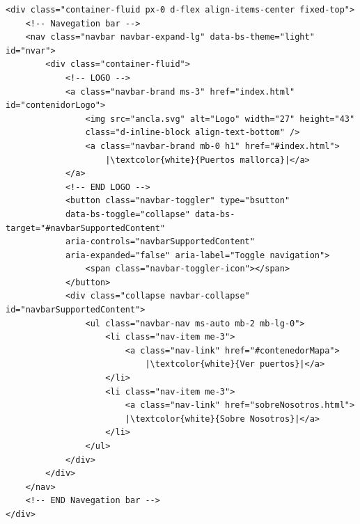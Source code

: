 \documentclass{article}
\begin{document}
\begin{verbatim}
<div class="container-fluid px-0 d-flex align-items-center fixed-top">
    <!-- Navegation bar -->
    <nav class="navbar navbar-expand-lg" data-bs-theme="light" id="nvar">
        <div class="container-fluid">
            <!-- LOGO -->
            <a class="navbar-brand ms-3" href="index.html" id="contenidorLogo">
                <img src="ancla.svg" alt="Logo" width="27" height="43" 
                class="d-inline-block align-text-bottom" />
                <a class="navbar-brand mb-0 h1" href="#index.html">
                    |\textcolor{white}{Puertos mallorca}|</a>
            </a>
            <!-- END LOGO -->
            <button class="navbar-toggler" type="bsutton" 
            data-bs-toggle="collapse" data-bs-target="#navbarSupportedContent" 
            aria-controls="navbarSupportedContent"
            aria-expanded="false" aria-label="Toggle navigation">
                <span class="navbar-toggler-icon"></span>
            </button>
            <div class="collapse navbar-collapse" id="navbarSupportedContent">
                <ul class="navbar-nav ms-auto mb-2 mb-lg-0">
                    <li class="nav-item me-3">
                        <a class="nav-link" href="#contenedorMapa">
                            |\textcolor{white}{Ver puertos}|</a>
                    </li>
                    <li class="nav-item me-3">
                        <a class="nav-link" href="sobreNosotros.html">
                        |\textcolor{white}{Sobre Nosotros}|</a>
                    </li>
                </ul>
            </div>
        </div>
    </nav>
    <!-- END Navegation bar -->
</div>
\end{verbatim}
\end{document}
